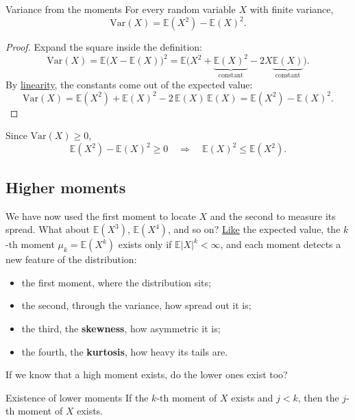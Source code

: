\documentclass[a4paper,12pt,oneside]{report}
\begin{document}
\begin{framedprop}{Variance from the moments}\label{prop:var-moments}
For every random variable $X$ with finite variance,
\[
\mathrm{Var}(X)=\mathbb{E}(X^2)-\mathbb{E}(X)^2 .
\]
\end{framedprop}

\begin{proof}
Expand the square inside the definition:
\[
\mathrm{Var}(X)=\mathbb{E}\big(X-\mathbb{E}(X)\big)^2
=\mathbb{E}\Big(X^2+\underbrace{\mathbb{E}(X)^2}_{\text{constant}}
-2X\underbrace{\mathbb{E}(X)}_{\text{constant}}\Big).
\]
By \hyperref[prop:linear]{linearity}, the constants come out of the
expected value:
\[
\mathrm{Var}(X)=\mathbb{E}(X^2)+\mathbb{E}(X)^2-2\,\mathbb{E}(X)\,\mathbb{E}(X)
=\mathbb{E}(X^2)-\mathbb{E}(X)^2 .
\]
\end{proof}

Since $\mathrm{Var}(X)\ge0$,
\[
\mathbb{E}(X^2)-\mathbb{E}(X)^2\ge0
\quad\Longrightarrow\quad
\mathbb{E}(X)^2\le\mathbb{E}(X^2).
\]

\subsection{Higher moments}\label{sec:higher-moments}

We have now used the first moment to locate $X$ and the second to measure
its spread. What about $\mathbb{E}(X^3)$, $\mathbb{E}(X^4)$, and so on?
\hyperref[def:expected-value]{Like} the expected value, the $k$-th moment $\mu_k=\mathbb{E}(X^k)$ exists
only if $\mathbb{E}|X|^k<\infty$, and each moment detects a new feature of
the distribution:
\begin{itemize}
\item the first moment, where the distribution sits;
\item the second, through the variance, how spread out it is;
\item the third, the \textbf{skewness}, how asymmetric it is;
\item the fourth, the \textbf{kurtosis}, how heavy its tails are.
\end{itemize}

If we know that a high moment exists, do the lower ones exist too?

\begin{framedprop}{Existence of lower moments}\label{prop:lower-moments}
If the $k$-th moment of $X$ exists and $j<k$, then the $j$-th moment of
$X$ exists.
\end{framedprop}
\end{document}
